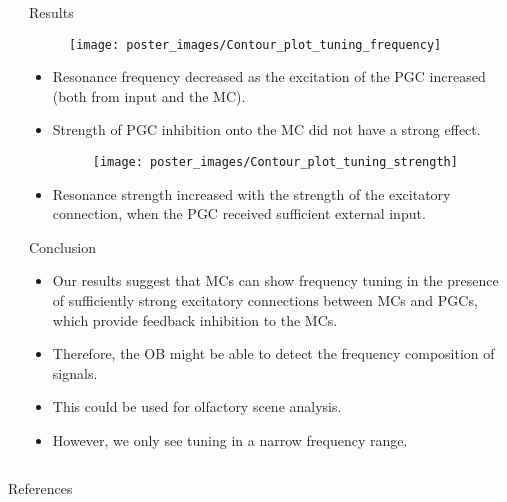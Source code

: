 \documentclass[final,hyperref={pdfpagelabels=false}]{beamer}
\begin{document}
\begin{frame}{}
\begin{columns}[t]
\begin{column}{.48\linewidth}
\end{column}
\begin{column}{.48\linewidth}

\begin{block}{Results}
\begin{figure}
\center
\texttt{[image: poster\_images/Contour\_plot\_tuning\_frequency]}
\end{figure}

\begin{itemize}
\item Resonance frequency decreased as the excitation of the PGC increased (both from input and the MC).
\item Strength of PGC inhibition onto the MC did not have a strong effect.

\begin{figure}
\center
\texttt{[image: poster\_images/Contour\_plot\_tuning\_strength]}
\end{figure} 

\item Resonance strength increased with the strength of the excitatory connection, when the PGC received sufficient external input.
\end{itemize}
\end{block}

\begin{block}{Conclusion}
\begin{itemize}
\item Our results suggest that MCs can show frequency tuning in the presence of sufficiently strong excitatory connections between MCs and PGCs, which provide feedback inhibition to the MCs.
\item Therefore, the OB might be able to detect the frequency composition of signals.
\item This could be used for olfactory scene analysis.
\item However, we only see tuning in a narrow frequency range.
\end{itemize}
\end{block}

\end{column}
\end{columns}

\begin{block}{References}
\nocite{*}

{\footnotesize
}
\end{block}

\end{frame}
\end{document}
